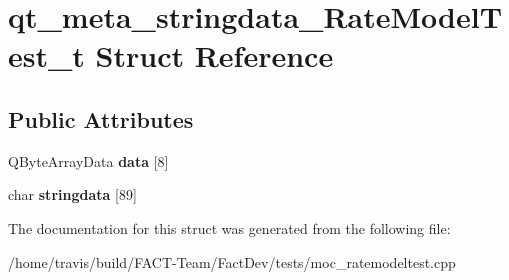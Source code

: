 \hypertarget{structqt__meta__stringdata__RateModelTest__t}{\section{qt\-\_\-meta\-\_\-stringdata\-\_\-\-Rate\-Model\-Test\-\_\-t Struct Reference}
\label{structqt__meta__stringdata__RateModelTest__t}
}
\subsection*{Public Attributes}
\begin{DoxyCompactItemize}
\item 
\hypertarget{structqt__meta__stringdata__RateModelTest__t_addab6f66a1e30c4fd5913d187bf3eff5}{Q\-Byte\-Array\-Data {\bfseries data} \mbox{[}8\mbox{]}}\label{structqt__meta__stringdata__RateModelTest__t_addab6f66a1e30c4fd5913d187bf3eff5}

\item 
\hypertarget{structqt__meta__stringdata__RateModelTest__t_a0239c9fb12e02d44afe755855ce7c471}{char {\bfseries stringdata} \mbox{[}89\mbox{]}}\label{structqt__meta__stringdata__RateModelTest__t_a0239c9fb12e02d44afe755855ce7c471}

\end{DoxyCompactItemize}


The documentation for this struct was generated from the following file\-:\begin{DoxyCompactItemize}
\item 
/home/travis/build/\-F\-A\-C\-T-\/\-Team/\-Fact\-Dev/tests/moc\-\_\-ratemodeltest.\-cpp\end{DoxyCompactItemize}
